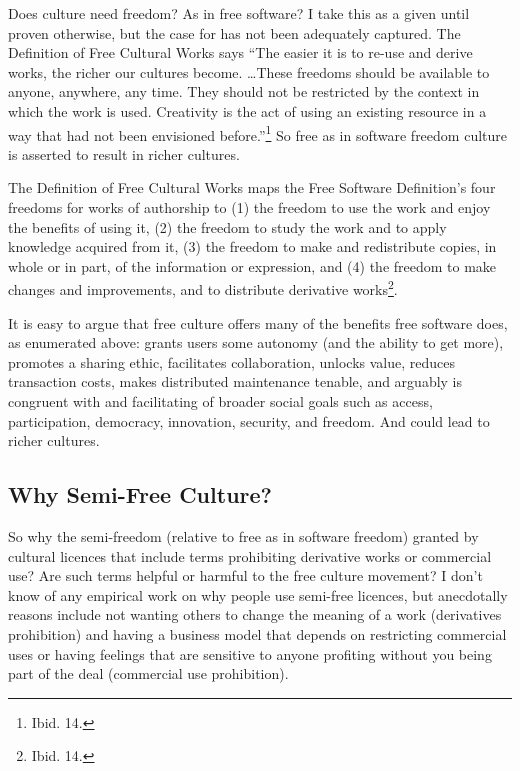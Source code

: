 Does culture need freedom? As in free software? I take this as a given until
proven otherwise, but the case for has not been adequately captured. The
Def\hbox{}inition of Free Cultural Works says ``The easier it is to re-use and
derive works, the richer our cultures become. \ldots These freedoms should be
available to anyone, anywhere, any time. They should not be restricted by the
context in which the work is used. Creativity is the act of using an existing
resource in a way that had not been envisioned before.''\footnote{Ibid. 14.} So
free as in software freedom culture is asserted to result in richer cultures.

The Def\hbox{}inition of Free Cultural Works maps the Free Software
Def\hbox{}inition's four freedoms for works of authorship to (1) the freedom to
use the work and enjoy the benef\hbox{}its of using it, (2) the freedom to study
the work and to apply knowledge acquired from it, (3) the freedom to make and
redistribute copies, in whole or in part, of the information or expression, and
(4) the freedom to make changes and improvements, and to distribute derivative
works\footnote{Ibid. 14.}.

It is easy to argue that free culture of\hbox{}fers many of the benef\hbox{}its
free software does, as enumerated above: grants users some autonomy (and the
ability to get more), promotes a sharing ethic, facilitates collaboration,
unlocks value, reduces transaction costs, makes distributed maintenance tenable,
and arguably is congruent with and facilitating of broader social goals such as
access, participation, democracy, innovation, security, and freedom. And could
lead to richer cultures.


\subsection{Why Semi-Free Culture?}
\label{ss:free_culture_software_freedom:freedom:semi-free}

So why the semi-freedom (relative to free as in software freedom) granted by
cultural licences that include terms prohibiting derivative works or commercial
use? Are such terms helpful or harmful to the free culture movement? I don't
know of any empirical work on why people use semi-free licences, but anecdotally
reasons include not wanting others to change the meaning of a work (derivatives
prohibition) and having a business model that depends on restricting commercial
uses or having feelings that are sensitive to anyone prof\hbox{}iting without
you being part of the deal (commercial use prohibition).

